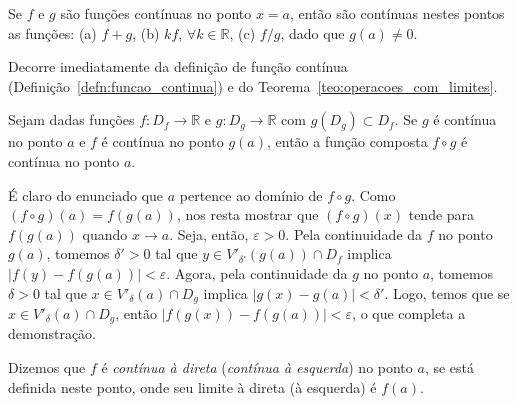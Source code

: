 \begin{teo}
  Se $f$ e $g$ são funções contínuas no ponto $x=a$, então são contínuas nestes pontos as funções: (a) $f+g$, (b) $kf$, $\forall k\in\mathbb{R}$, (c) $f/g$, dado que $g(a)\neq 0$.
\end{teo}
\begin{dem}
  Decorre imediatamente da definição de função contínua (Definição~\ref{defn:funcao_continua}) e do Teorema~\ref{teo:operacoes_com_limites}.
\end{dem}

\begin{teo}
  Sejam dadas funções $f:D_f\to\mathbb{R}$ e $g:D_g\to\mathbb{R}$ com $g(D_g)\subset D_f$. Se $g$ é contínua no ponto $a$ e $f$ é contínua no ponto $g(a)$, então a função composta $f\circ g$ é contínua no ponto $a$.
\end{teo}
\begin{dem}
  É claro do enunciado que $a$ pertence ao domínio de $f\circ g$. Como $(f\circ g)(a) = f(g(a))$, nos resta mostrar que $(f\circ g)(x)$ tende para $f(g(a))$ quando $x\to a$. Seja, então, $\varepsilon>0$. Pela continuidade da $f$ no ponto $g(a)$, tomemos $\delta'>0$ tal que $y\in V'_{\delta'}(g(a))\cap D_f$ implica $|f(y)-f(g(a))|<\varepsilon$. Agora, pela continuidade da $g$ no ponto $a$, tomemos $\delta>0$ tal que $x\in V'_{\delta}(a)\cap D_g$ implica $|g(x)-g(a)|<\delta'$. Logo, temos que se $x\in V'_{\delta}(a)\cap D_g$, então $|f(g(x))-f(g(a))|<\varepsilon$, o que completa a demonstração.
\end{dem}

\begin{defn}
  Dizemos que $f$ é \emph{contínua à direta} (\emph{contínua à esquerda}) no ponto $a$, se está definida neste ponto, onde seu limite à direta (à esquerda) é $f(a)$.
\end{defn}

